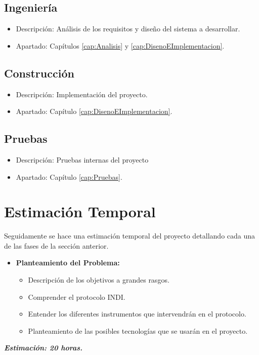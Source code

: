 \subsection{Ingeniería}
\begin{itemize}
  \item Descripción: Análisis de los requisitos y diseño del sistema a desarrollar.
  \item Apartado: Capítulos \ref{cap:Analisis} y \ref{cap:DisenoEImplementacion}.\\
\end{itemize}

\subsection{Construcción}
\begin{itemize}
  \item Descripción: Implementación del proyecto.
  \item Apartado: Capítulo \ref{cap:DisenoEImplementacion}.\\
\end{itemize}

\subsection{Pruebas}
\begin{itemize}
  \item Descripción: Pruebas internas del proyecto
  \item Apartado: Capítulo \ref{cap:Pruebas}.\\
\end{itemize}


\section{Estimación Temporal}
Seguidamente se hace una estimación temporal del proyecto detallando cada una de las fases de la sección anterior.

\begin{itemize}
  \item \textbf{Planteamiento del Problema:}
  \begin{itemize}
    \item Descripción de los objetivos a grandes rasgos.
    \item Comprender el protocolo INDI.
    \item Entender los diferentes instrumentos que intervendrán en el protocolo.
    \item Planteamiento de las posibles tecnologías que se usarán en el proyecto.
  \end{itemize}
\end{itemize}
\textit{\textbf{Estimación: 20 horas.}}\\ \\

